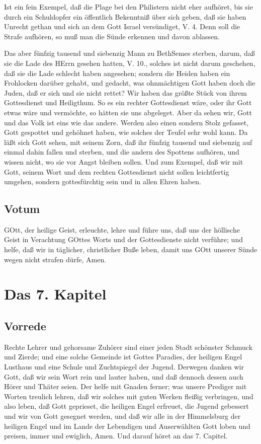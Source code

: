 Ist ein fein Exempel, daß die Plage bei den Philistern nicht eher aufhöret, bis sie durch ein Schuldopfer ein öffentlich Bekenntniß über sich geben, daß sie haben Unrecht gethan und sich an dem Gott Israel versündiget, V. 4. Denn soll die Strafe aufhören, so muß man die Sünde erkennen und davon ablassen.

Das aber fünfzig tausend und siebenzig Mann zu BethSemes sterben, darum, daß sie die Lade des HErrn gesehen hatten, V. 10., solches ist nicht darum geschehen, daß sie die Lade schlecht haben angesehen; sondern die Heiden haben ein Frohlocken darüber gehabt, und gedacht, was ohnmächtigen Gott haben doch die Juden, daß er sich und sie nicht rettet? Wir haben das größte Stück von ihrem Gottesdienst und Heiligthum. So es ein rechter Gottesdienst wäre, oder ihr Gott etwas wäre und vermöchte, so hätten sie uns abgeleget. Aber da sehen wir, Gott und das Volk ist eins wie das andere. Werden also einen sondern Stolz gefasset, Gott gespottet und gehöhnet haben, wie solches der Teufel sehr wohl kann. Da läßt sich Gott sehen, mit seinem Zorn, daß ihr fünfzig tausend und siebenzig auf einmal dahin fallen und sterben, und die andern des Spottens aufhören, und wissen nicht, wo sie vor Angst bleiben sollen. Und zum Exempel, daß wir mit Gott, seinem Wort und dem rechten Gottesdienst nicht sollen leichtfertig umgehen, sondern gottesfürchtig sein und in allen Ehren haben.

\section{Votum}

GOtt, der heilige Geist, erleuchte, lehre und führe uns, daß uns der höllische Geist in Verachtung GOttes Worts und der Gottesdienste nicht verführe; und helfe, daß wir in täglicher, christlicher Buße leben, damit uns GOtt unserer Sünde wegen nicht strafen dürfe, Amen.

\chapter{Das 7. Kapitel}

\section{Vorrede}

Rechte Lehrer und gehorsame Zuhörer sind einer jeden Stadt schönster Schmuck und Zierde; und eine solche Gemeinde ist Gottes Paradies, der heiligen Engel Lusthaus und eine Schule und Zuchtspiegel der Jugend. Derwegen danken wir Gott, daß wir sein Wort rein und lauter haben, und daß dennoch dessen auch Hörer und Thäter seien. Der helfe mit Gnaden ferner; was unsere Prediger mit Worten treulich lehren,
daß wir solches mit guten Werken fleißig verbringen, und also leben, daß Gott geprieset, die heiligen Engel erfreuet, die Jugend gebessert und wir von Gott gesegnet werden, und daß wir alle in der Himmelsburg der heiligen Engel und im Lande der Lebendigen und Auserwählten Gott loben und preisen, immer und ewiglich, Amen. Und darauf höret an das 7. Capitel.

